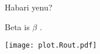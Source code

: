 \documentclass[12pt]{article}
\begin{document}
Habari yenu?

Beta is $\beta$ \cite{LawaLouw18}.

\texttt{[image: plot.Rout.pdf]}

\printbibliography
\end{document}
